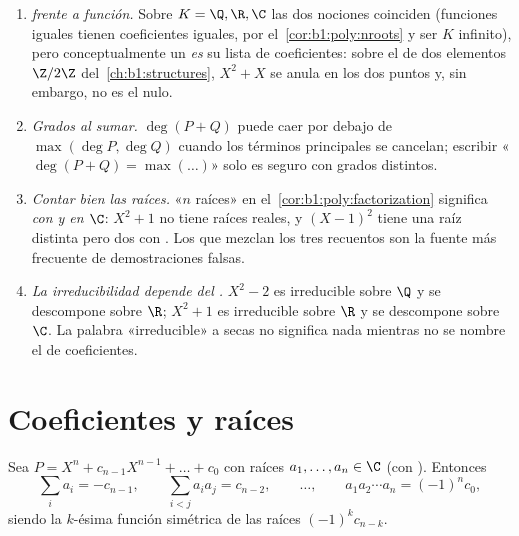 \begin{remark}\label{rem:b1:poly:pitfalls}
\begin{enumerate}
  \item \emph{ frente a función.} Sobre $K = \Q, \R, \C$
        las dos nociones coinciden (funciones iguales tienen
        coeficientes iguales, por el~\cref{cor:b1:poly:nroots} y ser
        $K$ infinito), pero conceptualmente un  \emph{es} su
        lista de coeficientes: sobre el  de dos elementos
        $\Z/2\Z$ del~\cref{ch:b1:structures}, $X^2 + X$ se anula en los
        dos puntos y, sin embargo, no es el  nulo.
  \item \emph{Grados al sumar.} $\deg(P + Q)$ puede caer por debajo
        de $\max(\deg P, \deg Q)$ cuando los términos principales se
        cancelan; escribir «$\deg(P + Q) = \max(\dots)$» solo es
        seguro con grados distintos.
  \item \emph{Contar bien las raíces.} «$n$ raíces» en
        el~\cref{cor:b1:poly:factorization} significa \emph{con
         y en $\C$}: $X^2 + 1$ no tiene raíces reales, y
        $(X-1)^2$ tiene una raíz distinta pero dos con
        . Los  que mezclan los tres recuentos
        son la fuente más frecuente de demostraciones falsas.
  \item \emph{La irreducibilidad depende del .} $X^2 - 2$ es
        irreducible sobre $\Q$ y se descompone sobre $\R$; $X^2 + 1$
        es irreducible sobre $\R$ y se descompone sobre $\C$. La
        palabra «irreducible» a secas no significa nada mientras no se
        nombre el  de coeficientes.
\end{enumerate}
\end{remark}

\section{Coeficientes y raíces}

\begin{theorem}\label{thm:b1:poly:vieta}
Sea $P = X^n + c_{n-1} X^{n-1} + \dots + c_0$  con raíces
$a_1, \dots, a_n \in \C$ (con ). Entonces
\[
\sum_i a_i = -c_{n-1},
\qquad
\sum_{i < j} a_i a_j = c_{n-2},
\qquad \dots, \qquad
a_1 a_2 \cdots a_n = (-1)^n c_0 ,
\]
siendo la $k$-ésima función simétrica de las raíces $(-1)^k c_{n-k}$.
\end{theorem}

